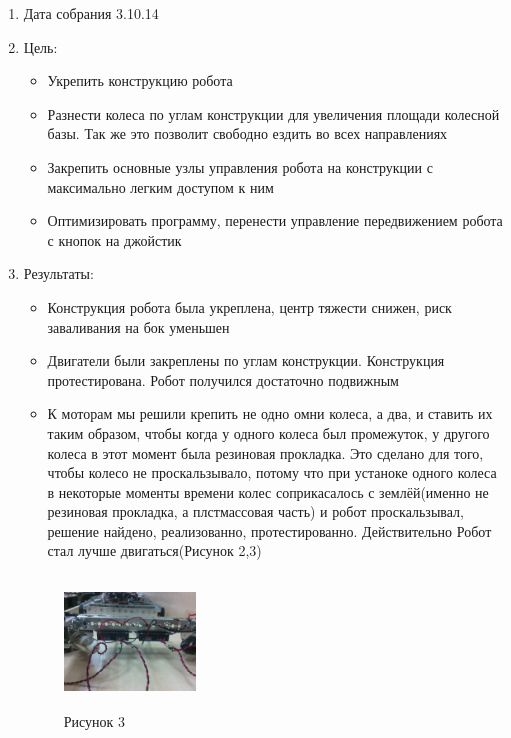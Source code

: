 
\begin{enumerate}
		\item Дата собрания 3.10.14
		\item Цель:
		\begin{itemize}
			\item Укрепить конструкцию робота
			\item Разнести колеса по углам конструкции для увеличения площади колесной базы. Так же это позволит свободно ездить во всех направлениях
			\item Закрепить основные узлы управления робота на конструкции с максимально легким доступом к ним
			\item Оптимизировать программу, перенести управление передвижением робота с кнопок на джойстик
		\end{itemize}
		\item Результаты:
		\begin{itemize}
			\item Конструкция робота была укреплена, центр тяжести снижен, риск заваливания на бок уменьшен  
			\item Двигатели были закреплены по углам конструкции. Конструкция протестирована. Робот получился достаточно подвижным
			\item К моторам мы решили крепить не одно омни колеса, а два, и ставить их таким образом, чтобы когда у одного колеса был промежуток, у другого колеса в этот момент была резиновая прокладка. Это сделано для того, чтобы колесо не проскальзывало, потому что при устаноке одного колеса в некоторые моменты времени колес соприкасалось с землёй(именно не резиновая прокладка, а плстмассовая часть) и робот проскальзывал, решение найдено, реализованно, протестированно. Действительно Робот стал лучше двигаться(Рисунок 2,3)
		\end{itemize}
		\begin{figure} [h]
			\centering
			\begin{minipage}{0.3\linewidth}
				\includegraphics[width=35mm,height=35mm]{Days/3.10.14/3_1_robot}\\ Рисунок 3
			\end{minipage}
			\begin{minipage}{0.3\linewidth}

\end{minipage}
\end{figure}
\end{enumerate}
